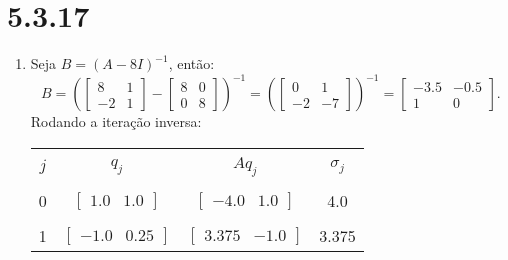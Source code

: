 \documentclass[a4paper,11pt]{article}
\begin{document}
    \section*{5.3.17}
        \begin{enumerate}[label=\textbf{(\alph*)}]
            \item Seja $B = (A - 8I)^{-1}$, então:
            $$
            B = 
            \left ( 
            \begin{bmatrix}
                8 & 1 \\
                -2 & 1
            \end{bmatrix}
            -
            \begin{bmatrix}
                8 & 0 \\
                0 & 8
            \end{bmatrix}
            \right ) ^{-1}
            =
            \left ( 
            \begin{bmatrix}
                0 & 1 \\
                -2 & -7
            \end{bmatrix}
            \right ) ^{-1}
            =
            \begin{bmatrix}
                -3.5 & -0.5 \\
                1 & 0
            \end{bmatrix}.
            $$
            Rodando a iteração inversa:
            \begin{center}
                \begin{tabular}{ | c | c | c | c | } 
                    \hline
                    & & & \\ [-1em]
                    $j$ & $q_j$ & $Aq_j$ & $\sigma_j$\\  [+.5em]
                    \hline\hline
                    & & & \\ [-1em]
                    0  & $\begin{bmatrix} 1.0 & 1.0 \end{bmatrix}$ & $\begin{bmatrix} -4.0 & 1.0 \end{bmatrix}$  & 4.0 \\ [+.5em]
                    \hline
                    & & & \\ [-1em]
                    1  & $\begin{bmatrix} -1.0 & 0.25 \end{bmatrix}$ & $\begin{bmatrix} 3.375 & -1.0 \end{bmatrix}$  & 3.375 \\ [+.5em]

\end{tabular}
\end{center}
\end{enumerate}
\end{document}
